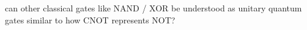 \documentclass[preview]{standalone}
\begin{document}
\begin{center}
can other classical gates like NAND / XOR be understood as unitary quantum gates similar to how CNOT represents NOT?
\end{center}
\end{document}
